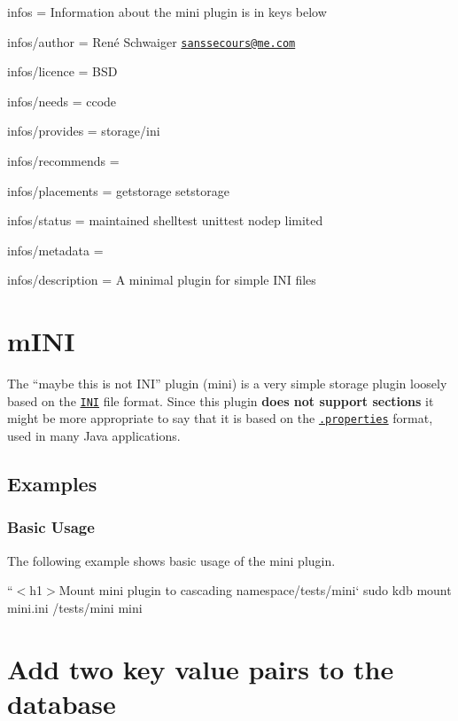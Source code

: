 
\begin{DoxyItemize}
\item infos = Information about the mini plugin is in keys below
\item infos/author = René Schwaiger \href{mailto:sanssecours@me.com}{\tt sanssecours@me.\+com}
\item infos/licence = B\+SD
\item infos/needs = ccode
\item infos/provides = storage/ini
\item infos/recommends =
\item infos/placements = getstorage setstorage
\item infos/status = maintained shelltest unittest nodep limited
\item infos/metadata =
\item infos/description = A minimal plugin for simple I\+NI files
\end{DoxyItemize}\hypertarget{md_src_plugins_mini_README_src_plugins_mini_README_md}{}\section{m\+I\+NI}\label{md_src_plugins_mini_README_src_plugins_mini_README_md}
The “maybe this is not I\+N\+I” plugin ({\ttfamily mini}) is a very simple storage plugin loosely based on the \href{https://en.wikipedia.org/wiki/INI_file}{\tt I\+NI} file format. Since this plugin {\bfseries does not support sections} it might be more appropriate to say that it is based on the \href{https://en.wikipedia.org/wiki/.properties}{\tt .properties} format, used in many Java applications.

\subsection*{Examples}

\subsubsection*{Basic Usage}

The following example shows basic usage of the {\ttfamily mini} plugin.

``{\ttfamily  $<$h1$>$Mount mini plugin to cascading namespace}/tests/mini` sudo kdb mount mini.\+ini /tests/mini mini

\section*{Add two key value pairs to the database}

